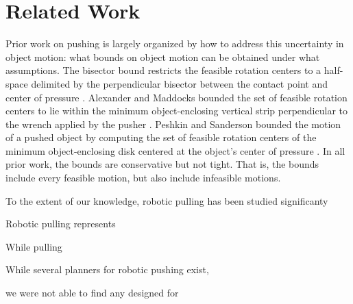 \documentclass[conference]{IEEEtran}
\begin{document}

\section{Related Work}\label{sec:related-work}


Prior work on pushing is largely organized by how to address this
uncertainty in object motion: what bounds on object motion can be
obtained under what assumptions. 
The bisector bound restricts the feasible rotation centers to a
half-space delimited by the perpendicular bisector between the contact
point and center of pressure \cite{Mason}.  Alexander and Maddocks
bounded the set of feasible rotation centers to lie within the minimum
object-enclosing vertical strip perpendicular to the wrench applied by
the pusher \cite{alexander1993bounds}.  Peshkin and Sanderson bounded
the motion of a pushed object by computing the set of feasible
rotation centers of the minimum object-enclosing disk centered at the
object's center of pressure \cite{peshkin1988motion}. In all prior
work, the bounds are conservative but not tight. That is, the bounds
include every feasible motion, but also include infeasible motions.

To the extent of our knowledge, robotic pulling has been studied significanty 

Robotic pulling represents 

While pulling 

While several planners for robotic pushing exist, 

we were not able to find any designed for

\end{document}
